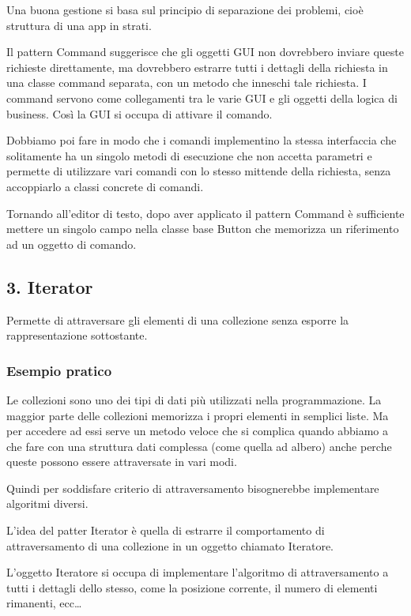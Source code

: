 \documentclass{report}
\begin{document}
\medskip
\noindent
Una buona gestione si basa sul principio di separazione dei problemi, cioè struttura di una app in strati.

\noindent
Il pattern Command suggerisce che gli oggetti GUI non dovrebbero inviare queste richieste direttamente, ma dovrebbero estrarre tutti i dettagli della richiesta in una classe command separata, con un metodo che inneschi tale richiesta. I command servono come collegamenti tra le varie GUI e gli oggetti della logica di business. Così la GUI si occupa di attivare il comando.

\noindent
Dobbiamo poi fare in modo che i comandi implementino la stessa interfaccia che solitamente ha un singolo metodi di esecuzione che non accetta parametri e permette di utilizzare vari comandi con lo stesso mittende della richiesta, senza accoppiarlo a classi concrete di comandi.

\smallskip
\noindent
Tornando all'editor di testo, dopo aver applicato il pattern Command è sufficiente mettere un singolo campo nella classe base Button che memorizza un riferimento ad un oggetto di comando.

\newpage
\subsection*{3. Iterator}
Permette di attraversare gli elementi di una collezione senza esporre la rappresentazione sottostante.

\subsubsection*{Esempio pratico}
Le collezioni sono uno dei tipi di dati più utilizzati nella programmazione. La maggior parte delle collezioni memorizza i propri elementi in semplici liste. Ma per accedere ad essi serve un metodo veloce che si complica quando abbiamo a che fare con una struttura dati complessa (come quella ad albero) anche perche queste possono essere attraversate in vari modi.

\noindent
Quindi per soddisfare criterio di attraversamento bisognerebbe implementare algoritmi diversi.

\medskip
\noindent
L'idea del patter Iterator è quella di estrarre il comportamento di attraversamento di una collezione in un oggetto chiamato Iteratore.

\noindent
L'oggetto Iteratore si occupa di implementare l'algoritmo di attraversamento a tutti i dettagli dello stesso, come la posizione corrente, il numero di elementi rimanenti, ecc\dots
\end{document}
